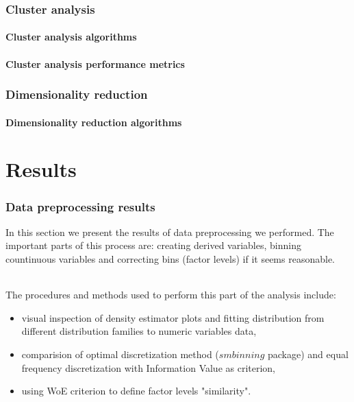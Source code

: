 \documentclass[10pt]{article}\usepackage[]{graphicx}\usepackage[]{color}
\begin{document}
\clearpage
\section{Cluster analysis}

\subsection{Cluster analysis algorithms}

\subsection{Cluster analysis performance metrics}




\clearpage
\section{Dimensionality reduction}

\subsection{Dimensionality reduction algorithms}





\clearpage
\part{Results}

\clearpage
\section{Data preprocessing results}
In this section we present the results of data preprocessing we performed. The important parts of this process are: creating derived variables, binning countinuous variables and correcting bins (factor levels) if it seems reasonable. 
\paragraph{}
The procedures and methods used to perform this part of the analysis include:
\begin{itemize}
\item visual inspection of density estimator plots and fitting distribution from different distribution families to numeric variables data,
\item comparision of optimal discretization method ($smbinning$ package) and equal frequency discretization with Information Value as criterion,
\item using WoE criterion to define factor levels "similarity".
\end{itemize}
\end{document}
